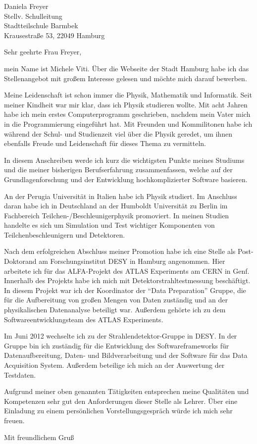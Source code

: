 \documentclass[ebner,paper=a4,fontsize=11pt,ngerman,BCOR=10mm]{scrlttr2}%
\begin{document}
\pagestyle{empty}

\begin{letter}{Daniela Freyer\\
Stellv. Schulleitung\\
Stadtteilschule Barmbek\\ 
Krausestra{\ss}e 53, 22049 Hamburg}


\opening{Sehr geehrte Frau Freyer,} 

mein Name ist Michele Viti. {\"U}ber die Webseite der Stadt Hamburg habe
ich das Stellenangebot mit gro{\ss}em Interesse gelesen und m{\"o}chte mich darauf bewerben.

Meine Leidenschaft ist schon immer die Physik,  Mathematik und  Informatik.
Seit meiner Kindheit war mir klar, dass ich Physik studieren wollte. Mit acht Jahren habe ich mein erstes Computerprogramm
geschrieben, nachdem mein Vater mich in die Programmierung eingef{\"u}hrt hat.
Mit Freunden und Kommilitonen habe ich w{\"a}hrend der Schul- und Studienzeit viel {\"u}ber die Physik geredet, um ihnen ebenfalls Freude und Leidenschaft f{\"u}r dieses Thema zu vermitteln.

In diesem Anschreiben werde ich kurz die wichtigsten Punkte meines Studiums und die
meiner bisherigen Berufserfahrung zusammenfassen, welche auf der Grundlagenforschung und der Entwicklung hochkomplizierter Software basieren.

An der Perugia Universit{\"a}t in Italien habe ich Physik studiert. Im Anschluss daran habe ich in Deutschland an der Humboldt Universit{\"a}t zu Berlin im Fachbereich
Teilchen-/Beschleunigerphysik promoviert. In meinen Studien handelte es sich um
Simulation und Test wichtiger Komponenten von Teilchenbeschleunigern und Detektoren.

Nach dem erfolgreichen Abschluss meiner Promotion habe ich eine Stelle als Post-Doktorand am Forschungsinstitut DESY in Hamburg angenommen. Hier arbeitete
ich f{\"u}r das ALFA-Projekt des ATLAS Experiments am CERN in Genf. Innerhalb des
Projekts habe ich mich mit Detektorstrahltestmessung besch{\"a}ftigt. In diesem Projekt
war ich der Koordinator der  "`Data Preparation"' Gruppe, die f{\"u}r die Aufbereitung
von gro{\ss}en Mengen von Daten zust{\"a}ndig und an der physikalischen Datenanalyse
beteiligt war. Au{\ss}erdem geh{\"o}rte ich zu dem Softwareentwicklungsteam des ATLAS
Experiments.

Im Juni 2012 wechselte ich zu der Strahlendetektor-Gruppe in DESY. In der Gruppe
bin ich zust{\"a}ndig f{\"u}r die Entwicklung des Softwareframeworks f{\"u}r Datenaufbereitung,
Daten- und Bildverarbeitung und der Software f{\"u}r das Data Acquisition System.
Au{\ss}erdem beteilige ich mich an der Auswertung der Testdaten.

Aufgrund meiner oben genannten T{\"a}tigkeiten entsprechen meine Qualit{\"a}ten und
Kompetenzen sehr gut den Anforderungen dieser Stelle als Lehrer. {\"U}ber eine Einladung zu einem pers{\"o}nlichen Vorstellungsgespr{\"a}ch w{\"u}rde ich mich sehr freuen.


\closing{Mit freundlichem Gru\ss}
\enlargethispage{6\baselineskip}

\end{letter}
\end{document}
